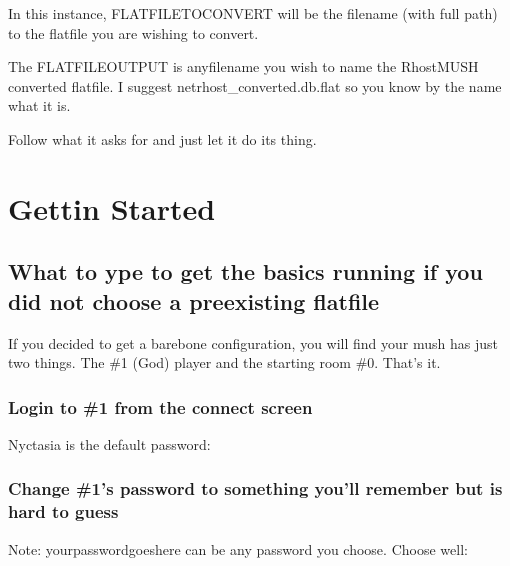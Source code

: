 \documentclass[letterpaper,10pt,english]{sphinxmanual}
\begin{document}
\sphinxAtStartPar
In this instance, FLATFILETOCONVERT will be the filename (with full path) to
the flatfile you are wishing to convert.

\sphinxAtStartPar
The FLATFILEOUTPUT is anyfilename you wish to name the RhostMUSH converted
flatfile.  I suggest netrhost\_converted.db.flat so you know by the name
what it is.

\sphinxAtStartPar
Follow what it asks for and just let it do its thing.


\chapter{Gettin Started}
\label{\detokenize{gettingstarted:gettin-started}}\label{\detokenize{gettingstarted::doc}}

\section{What to ype to get the basics running if you did not choose a pre\sphinxhyphen{}existing flatfile}
\label{\detokenize{gettingstarted:what-to-ype-to-get-the-basics-running-if-you-did-not-choose-a-pre-existing-flatfile}}
\sphinxAtStartPar
If you decided to get a bare\sphinxhyphen{}bone configuration, you will find your mush has just two things.  The \#1 (God) player and the starting room \#0.  That’s it.


\subsection{Login to \#1 from the connect screen}
\label{\detokenize{gettingstarted:login-to-1-from-the-connect-screen}}
\sphinxAtStartPar
Nyctasia is the default password:

\begin{sphinxVerbatim}[commandchars=\\\{\}]
 
\end{sphinxVerbatim}


\subsection{Change \#1’s password to something you’ll remember but is hard to guess}
\label{\detokenize{gettingstarted:change-1-s-password-to-something-you-ll-remember-but-is-hard-to-guess}}
\sphinxAtStartPar
Note: yourpasswordgoeshere can be any password you choose.  Choose well:

\begin{sphinxVerbatim}[commandchars=\\\{\}]
 
\end{sphinxVerbatim}
\end{document}

